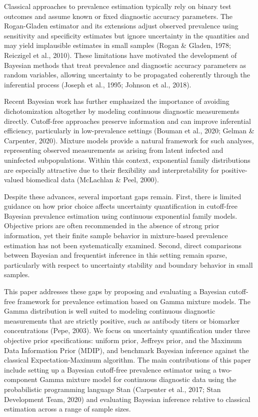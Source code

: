 \documentclass[11pt]{article}
\begin{document}
Classical approaches to prevalence estimation typically rely on binary test outcomes and assume known or fixed diagnostic accuracy parameters. The Rogan-Gladen estimator and its extensions adjust observed prevalence using sensitivity and specificity estimates but ignore uncertainty in the quantities and may yield implausible estimates in small samples (Rogan \& Gladen, 1978; Reiczigel et al., 2010). These limitations have motivated the development of Bayesian methods that treat prevalence and diagnostic accuracy parameters as random variables, allowing uncertainty to be propagated coherently through the inferential process (Joseph et al., 1995; Johnson et al., 2018).


Recent Bayesian work has further emphasized the importance of avoiding dichotomization altogether by modeling continuous diagnostic measurements directly. Cutoff-free approaches preserve information and can improve inferential efficiency, particularly in low-prevalence settings (Bouman et al., 2020; Gelman \& Carpenter, 2020). Mixture models provide a natural framework for such analyses, representing observed measurements as arising from latent infected and uninfected subpopulations. Within this context, exponential family distributions are especially attractive due to their flexibility and interpretability for positive-valued biomedical data (McLachlan \& Peel, 2000).

Despite these advances, several important gaps remain. First, there is limited guidance on how prior choice affects uncertainty quantification in cutoff-free Bayesian prevalence estimation using continuous exponential family models. Objective priors are often recommended in the absence of strong prior information, yet their finite sample behavior in mixture-based prevalence estimation has not been systematically examined. Second, direct comparisons between Bayesian and frequentist inference in this setting remain sparse, particularly with respect to uncertainty stability and boundary behavior in small samples.

This paper addresses these gaps by proposing and evaluating a Bayesian cutoff-free framework for prevalence estimation based on Gamma mixture models. The Gamma distribution is well suited to modeling continuous diagnostic measurements that are strictly positive, such as antibody titers or biomarker concentrations (Pepe, 2003). We focus on uncertainty quantification under three objective prior specifications: uniform prior, Jeffreys prior, and the Maximum Data Information Prior (MDIP), and benchmark Bayesian inference against the classical Expectation-Maximum algorithm. The main contributions of this paper include setting up a Bayesian cutoff-free prevalence estimator using a two-component Gamma mixture model for continuous diagnostic data using the probabilistic programming language Stan (Carpenter et al., 2017; Stan Development Team, 2020) and evaluating Bayesian inference relative to classical estimation across a range of sample sizes. 
\end{document}
